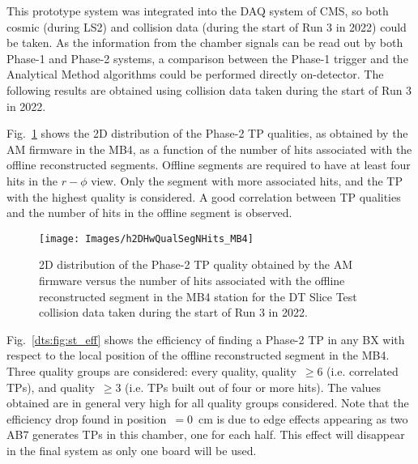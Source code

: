 \documentclass[../main.tex]{subfiles}
\begin{document}
This prototype system was integrated into the DAQ system of CMS, so both cosmic (during LS2) and collision data (during the start of Run 3 in 2022) could be taken. As the information from the chamber signals can be read out by both Phase-1 and Phase-2 systems, a comparison between the Phase-1 trigger and the Analytical Method algorithms could be performed directly on-detector. The following results are obtained using collision data taken during the start of Run 3 in 2022.

Fig.~\ref{dts:fig:st_hits} shows the 2D distribution of the Phase-2 TP qualities, as obtained by the AM firmware in the MB4, as a function of the number of hits associated with the offline reconstructed segments. Offline segments are required to have at least four hits in the $r-\phi$ view. Only the segment with more associated hits, and the TP with the highest quality is considered. A good correlation between TP qualities and the number of hits in the offline segment is observed.

\begin{figure}[h!]
\begin{center}
\texttt{[image: Images/h2DHwQualSegNHits\_MB4]}
\end{center}
\caption{2D distribution of the Phase-2 TP quality obtained by the AM firmware versus the number of hits associated with the offline reconstructed segment in the MB4 station for the DT Slice Test collision data taken during the start of Run 3 in 2022.}
\label{dts:fig:st_hits}
\end{figure}

Fig.~\ref{dts:fig:st_eff} shows the efficiency of finding a Phase-2 TP in any BX with respect to the local position of the offline reconstructed segment in the MB4. Three quality groups are considered: every quality, quality~$\geq 6$ (i.e. correlated TPs), and quality~$\geq 3$ (i.e. TPs built out of four or more hits). The values obtained are in general very high for all quality groups considered. Note that the efficiency drop found in position~$=0$~cm is due to edge effects appearing as two AB7 generates TPs in this chamber, one for each half. This effect will disappear in the final system as only one board will be used.
\end{document}
